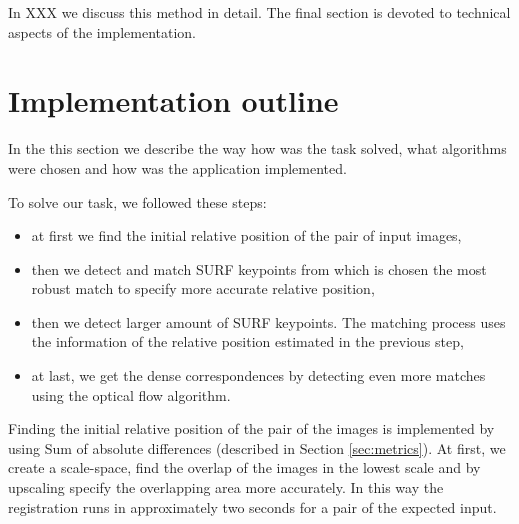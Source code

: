 In XXX we discuss this method in detail. 
The final section is devoted to technical aspects of the implementation. 

\section{Implementation outline}
\label{sec:impl_outline}
In the this section we describe the way how was the task solved, what algorithms were chosen and how was the application implemented.

To solve our task, we followed these steps:
\begin{itemize}
\item at first we find the initial relative position of the pair of input images,
\item then we detect and match SURF keypoints from which is chosen the most robust match to specify more accurate relative position,
\item then we detect larger amount of SURF keypoints. The matching process uses the information of the relative position estimated in the previous step,
\item at last, we get the dense correspondences by detecting even more matches using the optical flow algorithm.
\end{itemize}

Finding the initial relative position of the pair of the images is implemented by using Sum of absolute differences (described in Section \ref{sec:metrics}).
At first, we create a scale-space, find the overlap of the images in the lowest scale and by upscaling specify the overlapping area more accurately.
In this way the registration runs in approximately two seconds for a pair of the expected input.


